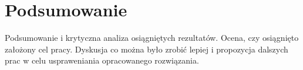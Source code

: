 \newpage %
\section{Podsumowanie}

Podsumowanie i krytyczna analiza osiągniętych rezultatów. 
Ocena, czy osiągnięto założony cel pracy.
Dyskusja co można było zrobić lepiej i propozycja dalszych prac w celu uspraweniania opracowanego rozwiązania.
